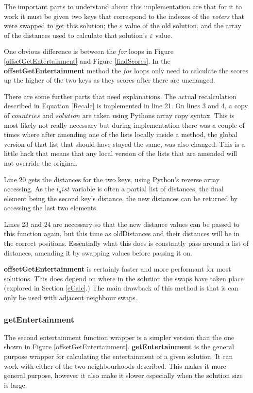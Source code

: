 \documentclass[12pt]{report}
\begin{document}
The important parts to understand about this implementation are that for it to work it must be given two keys that correspond to the indexes of the \textit{voters} that were swapped to get this solution; the $\varepsilon$ value of the old solution, and the array of the distances used to calculate that solution's $\varepsilon$ value.

One obvious difference is between the \textit{for} loops in Figure \ref{offsetGetEntertainment} and Figure \ref{findScores}. In the \textbf{offsetGetEntertainment} method the \textit{for} loops only need to calculate the scores up the higher of the two keys as they scores after there are unchanged.

There are some further parts that need explanations. The actual recalculation described in Equation \ref{Recalc} is implemented in line 21. On lines 3 and 4, a copy of $countries$ and $solution$ are taken using Pythons array copy syntax. This is most likely not really necessary but during implementation there was a couple of times where after amending one of the lists locally inside a method, the global version of that list that should have stayed the same, was also changed. This is a little hack that means that any local version of the lists that are amended will not override the original. 

Line 20 gets the distances for the two keys, using Python's reverse array accessing. As the $l_dist$ variable is often a partial list of distances, the final element being the second key's distance, the new distances can be returned by accessing the last two elements.

Lines 23 and 24 are necessary so that the new distance values can be passed to this function again, but this time as oldDistances and their distances will be in the correct positions. Essentially what this does is constantly pass around a list of distances, amending it by swapping values before passing it on.

\textbf{offsetGetEntertainment} is certainly faster and more performant for most solutions. This does depend on where in the solution the swaps have taken place (explored in Section \ref{eCalc}.) The main drawback of this method is that is can only be used with adjacent neighbour swaps.

\subsubsection{getEntertainment}
The second entertainment function wrapper is a simpler version than the one shown in Figure \ref{offsetGetEntertainment}. \textbf{getEntertainment} is the general purpose wrapper for calculating the entertainment of a given solution. It can work with either of the two neighbourhoods described. This makes it more general purpose, however it also make it slower especially when the solution size is large.
\end{document}
